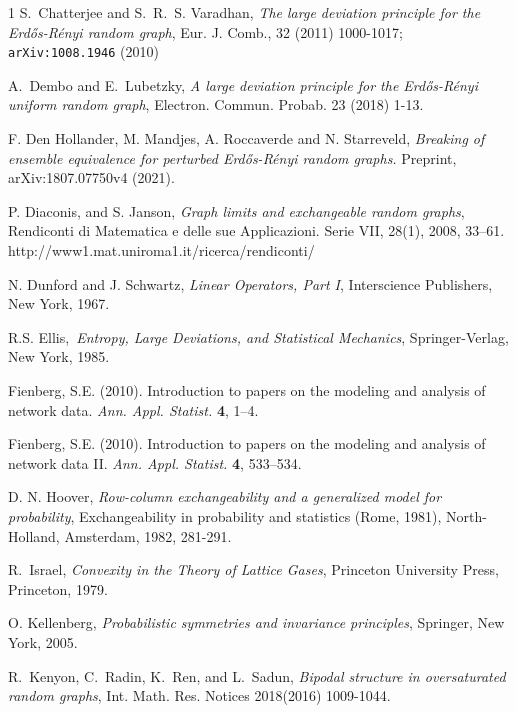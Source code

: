 \documentclass[12pt]{amsart}
\newcommand{\ER}{Erd\H{o}s-R\'enyi}
\begin{document}
{\begin{thebibliography}{1}
{\sc S.~Chatterjee and S.~R.~S. Varadhan}, \textit{The large deviation principle
  for the {Erd\H{o}s-R\'{e}nyi} random graph}, Eur. J. Comb., 32
(2011) 1000-1017; \texttt{arXiv:1008.1946} (2010)

 {\sc A.\ Dembo and E.\ Lubetzky},
{\em A large deviation principle for the Erd\H{o}s-R\'{e}nyi
uniform random graph}, Electron. Commun. Probab. 23 (2018) 1-13.

 {\sc F. Den Hollander, M. Mandjes, A. Roccaverde and N. Starreveld},
\textit{Breaking of ensemble equivalence for perturbed \ER{} random graphs.} Preprint, arXiv:1807.07750v4 (2021).

{\sc P. Diaconis, and S. Janson}, \textit{Graph limits and exchangeable random graphs}, Rendiconti di Matematica e delle sue Applicazioni. Serie VII, 28(1), 2008, 33--61. http://www1.mat.uniroma1.it/ricerca/rendiconti/

{\sc N. Dunford and J. Schwartz}, \textit{Linear Operators, Part I}, Interscience Publishers, New York, 1967.


 R.S. Ellis,\  \textit{Entropy, Large Deviations, and
Statistical Mechanics}, Springer-Verlag, New York, 1985.

{\sc  Fienberg, S.E.} (2010).
Introduction to papers on the  modeling and analysis of network data.
{\em Ann. Appl. Statist.} {\bf 4},   1--4.

{\sc  Fienberg, S.E.} (2010).
Introduction to papers on the  modeling and analysis of network data II.
{\em Ann. Appl. Statist.} {\bf  4},    533--534.


  {\sc D. N. Hoover},
  \textit{Row-column exchangeability and a generalized model for probability},
Exchangeability in probability and statistics (Rome, 1981),
North-Holland, Amsterdam, 1982, 281-291.

 {\sc R.\  Israel}, {\em Convexity in the Theory of Lattice Gases},
Princeton University Press, Princeton, 1979.

 {\sc O. Kellenberg},
\textit{Probabilistic symmetries and invariance principles},
Springer, New York, 2005.



{\sc R.~Kenyon, C.~Radin, K.~Ren, and L.~Sadun}, \textit{Bipodal structure in 
oversaturated random graphs}, Int. Math. Res. Notices 2018(2016) 1009-1044.


\end{thebibliography}}
\end{document}
